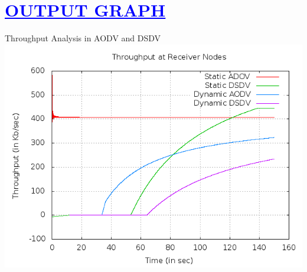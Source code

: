 \documentclass[a4paper,12pt]{report}
\begin{document}
\chapter{\textcolor{blue}{\underline {OUTPUT GRAPH}}}

 
\begin{center}
Throughput Analysis in AODV and DSDV
 \includegraphics[width=15 cm,height=15 cm]{./throughput.png}


\end{center}
\end{document}
